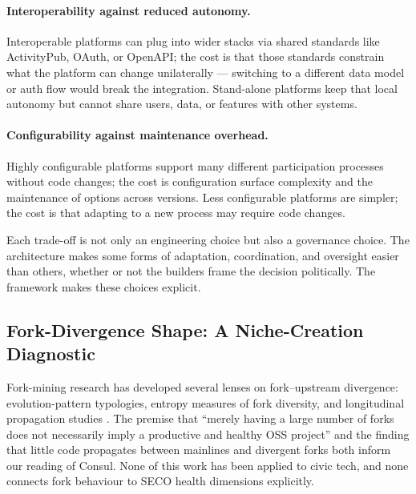 \documentclass[11pt,a4paper]{article}
\begin{document}
\paragraph{Interoperability against reduced autonomy.} Interoperable platforms can plug into wider stacks via shared standards like ActivityPub, OAuth, or OpenAPI; the cost is that those standards constrain what the platform can change unilaterally --- switching to a different data model or auth flow would break the integration. Stand-alone platforms keep that local autonomy but cannot share users, data, or features with other systems.

\paragraph{Configurability against maintenance overhead.} Highly configurable platforms support many different participation processes without code changes; the cost is configuration surface complexity and the maintenance of options across versions. Less configurable platforms are simpler; the cost is that adapting to a new process may require code changes.

Each trade-off is not only an engineering choice but also a governance choice. The architecture makes some forms of adaptation, coordination, and oversight easier than others, whether or not the builders frame the decision politically. The framework makes these choices explicit.

\subsection{Fork-Divergence Shape: A Niche-Creation Diagnostic}\label{sec:framework-fd}

Fork-mining research has developed several lenses on fork--upstream divergence: evolution-pattern typologies, entropy measures of fork diversity, and longitudinal propagation studies \citep{zhou2020forks, wang2023forkentropy, businge2022reuse}. The premise that ``merely having a large number of forks does not necessarily imply a productive and healthy OSS project'' \citep{wang2023forkentropy} and the finding that little code propagates between mainlines and divergent forks \citep{businge2022reuse} both inform our reading of Consul. None of this work has been applied to civic tech, and none connects fork behaviour to SECO health dimensions explicitly.
\end{document}
